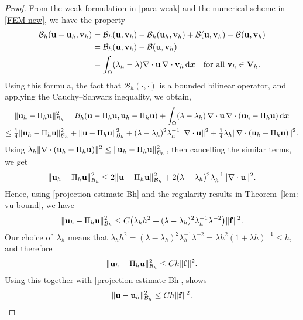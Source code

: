 \documentclass[11pt]{article}
\newcommand{\calB}{\mathcal{B}}
\newcommand{\vf}{{\bf f}}
\newcommand{\vu}{{\bf u}}
\newcommand{\vv}{{\bf v}}
\newcommand{\vV}{{\bf V}}
\newcommand{\bsx}{{\boldsymbol{x}}}
\numberwithin{equation}{section}
\newcommand{\ud}{\mathrm{d}}
\begin{document}
\begin{proof} 
From the weak formulation in \eqref{para weak} and the numerical scheme   in \eqref{FEM new}, we have the property 
\begin{align}\label{equ:Gal ort}
\calB_h(\vu-\vu_h, \vv_h) &= \calB_h(\vu, \vv_h)
    -\calB_h(\vu_h,\vv_h)+\calB(\vu,\vv_h)-\calB(\vu,\vv_h) \nonumber \\
&=\calB_h(\vu,\vv_h)-\calB(\vu,\vv_h)  \nonumber \\
&=\int_\Omega(\lambda_h-\lambda)\nabla\cdot\vu\,\nabla\cdot\vv_h\,\ud\bsx
\quad\text{for all $\vv_h \in \vV_h$.}
\end{align}
Using this formula, the fact that $\calB_h(\cdot, \cdot)$ is a bounded
bilinear operator, and applying the Cauchy--Schwarz inequality, we obtain,
\begin{multline*}
\|\vu_h-\Pi_h \vu\|_{\calB_h}^2=\calB_h(\vu-\Pi_h\vu,\vu_h-\Pi_h\vu)
    +\int_\Omega(\lambda-\lambda_h)\,\nabla\cdot\vu\,\nabla\cdot
    (\vu_h-\Pi_h\vu)\,\ud\bsx\\
    \le\tfrac14\|\vu_h-\Pi_h \vu\|_{\calB_h}^2+\|\vu-\Pi_h\vu\|_{\calB_h}^2
    +(\lambda-\lambda_h)^2\lambda_h^{-1}\|\nabla\cdot\vu\|^2
    +\tfrac{1}{4}\lambda_h\|\nabla\cdot(\vu_h-\Pi_h\vu)\|^2.
\end{multline*}
Using $\lambda_h\|\nabla\cdot(\vu_h-\Pi_h\vu)\|^2
\le\|\vu_h-\Pi_h\vu\|_{\calB_h}^2$, then cancelling the similar terms, we get
\[
\|\vu_h-\Pi_h\vu\|_{\calB_h}^2\le2\|\vu-\Pi_h\vu\|_{\calB_h}^2
    +2(\lambda-\lambda_h)^2\lambda_h^{-1}\|\nabla\cdot\vu\|^2.
\]
Hence, using \eqref{projection estimate Bh} and the regularity results in
Theorem~\ref{lem: vu bound},  we have
\[
\|\vu_h-\Pi_h \vu\|_{\calB_h}^2\le C\bigl(\lambda_hh^2
    +(\lambda-\lambda_h)^2\lambda_h^{-1}\lambda^{-2}\bigr)\|\vf\|^2.
\]
Our choice of~$\lambda_h$ means that
$\lambda_h h^2=(\lambda-\lambda_h)^2\lambda_h^{-1}\lambda^{-2}
    =\lambda h^2(1+\lambda h)^{-1}\le h$, and therefore
\begin{equation}\label{eq: uh Pih u}
\|\vu_h-\Pi_h \vu\|_{\calB_h}^2 \le Ch\|\vf\|^2.
\end{equation}
Using this  together with \eqref{projection estimate Bh}, shows
\begin{equation}\label{h1 error}
   \|\vu-\vu_h\|_{\calB_h}^2 \le Ch\|\vf\|^2.
\end{equation}


\end{proof}
\end{document}
